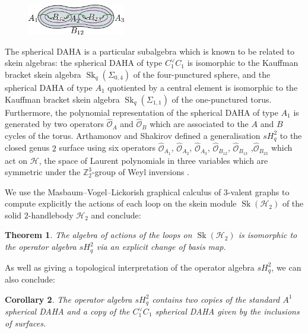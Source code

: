 \documentclass{article}
\newcommand{\Sk}{\operatorname{Sk}}
\newtheorem{thm}{Theorem}
\newtheorem{cor}[thm]{Corollary}
\begin{document}
\begin{figure}
  \begin{center}
    \includegraphics[width=0.38\textwidth]{2torus.pdf}
  \end{center}
\end{figure}
The spherical DAHA is a particular subalgebra which is known to be related to skein algebras: the spherical DAHA of type $C^{\vee}_1 C_1$ is isomorphic to the Kauffman bracket skein algebra $\Sk_q(\Sigma_{0,4})$ of the four-punctured sphere, and the spherical DAHA of type $A_1$ quotiented by a central element is isomorphic to the Kauffman bracket skein algebra $\Sk_q(\Sigma_{1,1})$ of the one-punctured torus. Furthermore, the polynomial representation of the spherical DAHA of type $A_1$ is generated by two operators $\hat{\mathscr{O}}_A$ and $\hat{\mathscr{O}}_B$ which are associated to the $A$ and $B$ cycles of the torus. Arthamonov and Shakirov defined a generalisation $sH^{2}_q$ to the closed genus $2$ surface using six operators $\hat{\mathscr{O}}_{A_1}$, $\hat{\mathscr{O}}_{A_2}$, $\hat{\mathscr{O}}_{A_3}$, $\hat{\mathscr{O}}_{B_{12}}$, $\hat{\mathscr{O}}_{B_{13}}$ ,$\hat{\mathscr{O}}_{B_{23}}$ which act on $\mathscr{H}$, the space of Laurent polynomials in three variables which are symmetric under the $\mathbb{Z}^3_2$-group of Weyl inversions \cite{ArthamonovShakirov19}. 

We use the Masbaum--Vogel--Lickorish graphical calculus of $3$-valent graphs \cite{MasbaumVogel94, Lickorish93} to compute explicitly the actions of each loop on the skein module $\Sk(\mathcal{H}_2)$ of the solid $2$-handlebody $\mathcal{H}_2$ and conclude: 

\begin{thm}
The algebra of actions of the loops on $\Sk(\mathcal{H}_2)$ is isomorphic to the operator algebra $sH^2_q$ via an explicit change of basis map. 
\end{thm}

As well as giving a topological interpretation of the operator algebra $sH^2_q$, we can also conclude:

\begin{cor}
The operator algebra $sH^2_q$ contains two copies of the standard $A^1$ spherical DAHA and a copy of the $C^{\vee}_1 C_1$ spherical DAHA given by the inclusions of surfaces. 
\end{cor}
\end{document}
